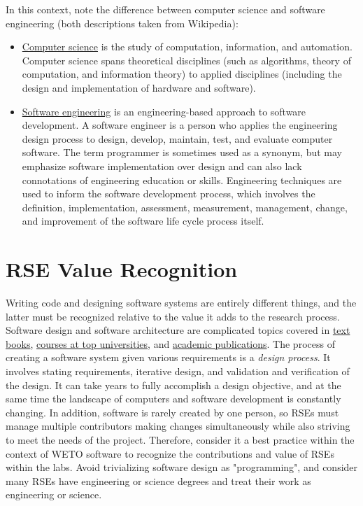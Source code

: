\documentclass[]{nlr}
\begin{document}
\begin{appendices}
In this context, note the difference between computer science and software engineering (both
descriptions taken from Wikipedia):
\begin{itemize}
\item \href{https://en.wikipedia.org/wiki/Computer_science}{Computer science} is the study of
    computation, information, and automation.
    Computer science spans theoretical disciplines (such as algorithms, theory of computation,
    and information theory) to applied disciplines (including the design and implementation of
    hardware and software).
    
\item \href{https://en.wikipedia.org/wiki/Software_engineering}{Software engineering} is an
    engineering-based approach to software development. A software
    engineer is a person who applies the engineering design process to design, develop, maintain,
    test, and evaluate computer software. The term programmer is sometimes used as a synonym,
    but may emphasize software implementation over design and can also lack connotations of
    engineering education or skills.
    Engineering techniques are used to inform the software development process, which involves the
    definition, implementation, assessment, measurement, management, change, and improvement of
    the software life cycle process itself.
\end{itemize}

\section{RSE Value Recognition}
Writing code and designing software systems are entirely different things, and the latter
must be recognized relative to the value it adds to the research process.
Software design and software architecture are complicated topics covered in
\href{https://www.amazon.com/s?k=software+design&i=stripbooks&crid=2L9GNOIMWHMFD&sprefix=software+design%2Cstripbooks%2C166&ref=nb_sb_noss_2}{text books},
\href{https://web.stanford.edu/~ouster/cs190-winter23/}{courses at top universities}, and
\href{https://www.researchgate.net/search.Search.html?query=software+architecture&type=publication&subfilter%5BpublicationType%5D=article%2Fbook&subfilter%5BstartYear%5D=2022}{academic publications}.
The process of creating a software system given various requirements is a \textit{design process}.
It involves stating requirements, iterative design, and validation and verification of the design.
It can take years to fully accomplish a design objective, and at the same time the landscape of
computers and software development is constantly changing.
In addition, software is rarely created by one person, so RSEs must manage multiple
contributors making changes simultaneously while also striving to meet the needs of the project.
Therefore, consider it a best practice within the context of WETO software to recognize
the contributions and value of RSEs within the labs.
Avoid trivializing software design as "programming", and consider many RSEs have engineering
or science degrees and treat their work as engineering or science.


\end{appendices}
\end{document}
